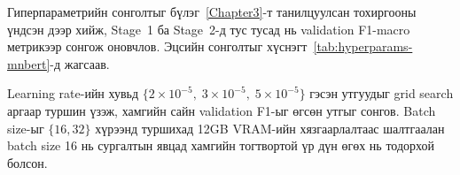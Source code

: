 Гиперпараметрийн сонголтыг бүлэг~\ref{Chapter3}-т танилцуулсан тохиргооны
үндсэн дээр хийж, Stage~1 ба Stage~2-д тус тусад нь validation F1-macro
метрикээр сонгож оновчлов. Эцсийн сонголтыг хүснэгт~\ref{tab:hyperparams-mnbert}-д
жагсаав.

\begin{table}[H]
\centering
\caption{Гиперпараметрийн эцсийн тохиргоо. Эцсийн тайлагнасан систем нь
  \textbf{Нэг шатлалт (Flat)} загвар; Stage~1/Stage~2 баганууд нь харьцуулалтад
  ашигласан хоёр шатлалт хувилбарынх.}
\label{tab:hyperparams-mnbert}
\end{table}

Learning rate-ийн хувьд $\{2\!\times\!10^{-5},\; 3\!\times\!10^{-5},\; 5\!\times\!10^{-5}\}$
гэсэн утгуудыг grid search аргаар туршин үзэж, хамгийн сайн validation F1-ыг
өгсөн утгыг сонгов. Batch size-ыг $\{16, 32\}$ хүрээнд туршихад 12GB VRAM-ийн
хязгаарлалтаас шалтгаалан batch size 16 нь сургалтын явцад хамгийн тогтвортой үр дүн өгөх нь тодорхой болсон.

